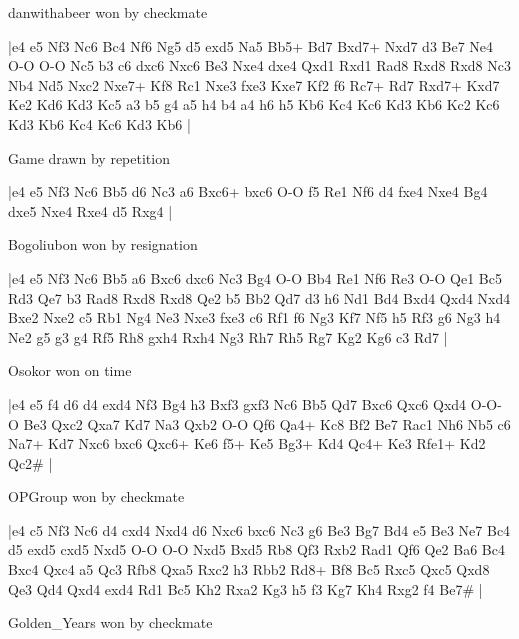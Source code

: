 \showboard

danwithabeer won by checkmate

\makegametitle
|e4 e5 Nf3 Nc6 Bc4 Nf6 Ng5 d5 exd5 Na5 Bb5+ Bd7 Bxd7+ Nxd7 d3 Be7 Ne4 O-O O-O Nc5 b3 c6 dxc6 Nxc6 Be3 Nxe4 dxe4 Qxd1 Rxd1 Rad8 Rxd8 Rxd8 Nc3 Nb4 Nd5 Nxc2 Nxe7+ Kf8 Rc1 Nxe3 fxe3 Kxe7 Kf2 f6 Rc7+ Rd7 Rxd7+ Kxd7 Ke2 Kd6 Kd3 Kc5 a3 b5 g4 a5 h4 b4 a4 h6 h5 Kb6 Kc4 Kc6 Kd3 Kb6 Kc2 Kc6 Kd3 Kb6 Kc4 Kc6 Kd3 Kb6  |

\showboard

Game drawn by repetition

\makegametitle
|e4 e5 Nf3 Nc6 Bb5 d6 Nc3 a6 Bxc6+ bxc6 O-O f5 Re1 Nf6 d4 fxe4 Nxe4 Bg4 dxe5 Nxe4 Rxe4 d5 Rxg4  |

\showboard

Bogoliubon won by resignation

\makegametitle
|e4 e5 Nf3 Nc6 Bb5 a6 Bxc6 dxc6 Nc3 Bg4 O-O Bb4 Re1 Nf6 Re3 O-O Qe1 Bc5 Rd3 Qe7 b3 Rad8 Rxd8 Rxd8 Qe2 b5 Bb2 Qd7 d3 h6 Nd1 Bd4 Bxd4 Qxd4 Nxd4 Bxe2 Nxe2 c5 Rb1 Ng4 Ne3 Nxe3 fxe3 c6 Rf1 f6 Ng3 Kf7 Nf5 h5 Rf3 g6 Ng3 h4 Ne2 g5 g3 g4 Rf5 Rh8 gxh4 Rxh4 Ng3 Rh7 Rh5 Rg7 Kg2 Kg6 c3 Rd7  |

\showboard

Osokor won on time

\makegametitle
|e4 e5 f4 d6 d4 exd4 Nf3 Bg4 h3 Bxf3 gxf3 Nc6 Bb5 Qd7 Bxc6 Qxc6 Qxd4 O-O-O Be3 Qxc2 Qxa7 Kd7 Na3 Qxb2 O-O Qf6 Qa4+ Kc8 Bf2 Be7 Rac1 Nh6 Nb5 c6 Na7+ Kd7 Nxc6 bxc6 Qxc6+ Ke6 f5+ Ke5 Bg3+ Kd4 Qc4+ Ke3 Rfe1+ Kd2 Qc2\#  |

\showboard

OPGroup won by checkmate

\makegametitle
|e4 c5 Nf3 Nc6 d4 cxd4 Nxd4 d6 Nxc6 bxc6 Nc3 g6 Be3 Bg7 Bd4 e5 Be3 Ne7 Bc4 d5 exd5 cxd5 Nxd5 O-O O-O Nxd5 Bxd5 Rb8 Qf3 Rxb2 Rad1 Qf6 Qe2 Ba6 Bc4 Bxc4 Qxc4 a5 Qc3 Rfb8 Qxa5 Rxc2 h3 Rbb2 Rd8+ Bf8 Bc5 Rxc5 Qxc5 Qxd8 Qe3 Qd4 Qxd4 exd4 Rd1 Bc5 Kh2 Rxa2 Kg3 h5 f3 Kg7 Kh4 Rxg2 f4 Be7\#  |

\showboard

Golden\_Years won by checkmate

